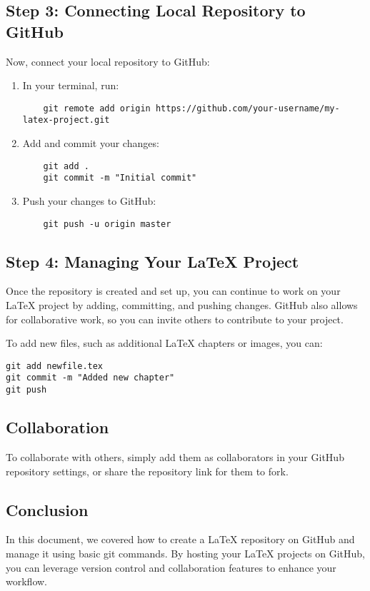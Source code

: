 \documentclass{article}
\begin{document}
\subsection*{Step 3: Connecting Local Repository to GitHub}
Now, connect your local repository to GitHub:
\begin{enumerate}
    \item In your terminal, run:
    \begin{verbatim}
    git remote add origin https://github.com/your-username/my-latex-project.git
    \end{verbatim}
    \item Add and commit your changes:
    \begin{verbatim}
    git add .
    git commit -m "Initial commit"
    \end{verbatim}
    \item Push your changes to GitHub:
    \begin{verbatim}
    git push -u origin master
    \end{verbatim}
\end{enumerate}

\subsection*{Step 4: Managing Your LaTeX Project}
Once the repository is created and set up, you can continue to work on your LaTeX project by adding, committing, and pushing changes. GitHub also allows for collaborative work, so you can invite others to contribute to your project.

To add new files, such as additional LaTeX chapters or images, you can:
\begin{verbatim}
git add newfile.tex
git commit -m "Added new chapter"
git push
\end{verbatim}

\subsection*{Collaboration}
To collaborate with others, simply add them as collaborators in your GitHub repository settings, or share the repository link for them to fork.

\subsection*{Conclusion}
In this document, we covered how to create a LaTeX repository on GitHub and manage it using basic git commands. By hosting your LaTeX projects on GitHub, you can leverage version control and collaboration features to enhance your workflow.
\end{document}

